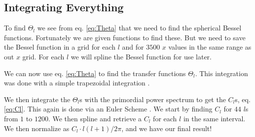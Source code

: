 \documentclass[a4paper,norsk, 10pt]{article}
\begin{document}
\subsection{Integrating Everything}
To find $\Theta_l$ we see from eq. \eqref{eq:Theta} that we need to find the spherical Bessel functions. Fortunately we are given functions to find these. But we need to save the Bessel function in a grid for each $l$ and for $3500$ $x$ values in the same range as out $x$ grid. For each $l$ we will spline the Bessel function for use later.

We can now use eq. \eqref{eq:Theta} to find the transfer functions $\Theta_l$. This integration was done with a simple trapezoidal integration . 

We then integrate the $\Theta_l$s with the primordial power spectrum to get the $C_l$s, eq. \eqref{eq:Cl}. This again is done via an Euler Scheme . We start by finding $C_l$ for $44$ $l$s from $1$ to $1200$. We then spline and retrieve a $C_l$ for each $l$ in the same interval. We then normalize as $C_l\cdot l(l+1)/2\pi$, and we have our final result!

\end{document}
